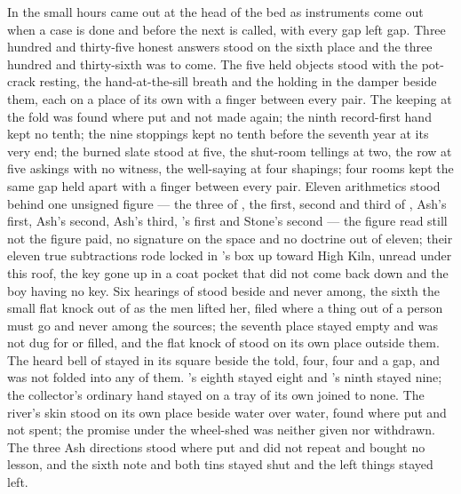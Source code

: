 In the small hours  came out at the head of the bed as instruments come out when a case is done and before the next is called, with every gap left gap. Three hundred and thirty-five honest answers stood on the sixth place and the three hundred and thirty-sixth was to come. The five held objects stood with the pot-crack resting, the hand-at-the-sill breath and the holding in the damper beside them, each on a place of its own with a finger between every pair. The keeping at the fold was found where put and not made again; the ninth record-first hand kept no tenth; the nine stoppings kept no tenth before the seventh year at its very end; the burned slate stood at five, the shut-room tellings at two, the row at five askings with no witness, the well-saying at four shapings; four rooms kept the same gap held apart with a finger between every pair. Eleven arithmetics stood behind one unsigned figure — the three of , the first, second and third of , Ash's first, Ash's second, Ash's third, 's first and Stone's second — the figure read still not the figure paid, no signature on the space and no doctrine out of eleven; their eleven true subtractions rode locked in 's box up  toward High Kiln, unread under this roof, the key gone up in a coat pocket that did not come back down and the boy having no key. Six hearings of  stood beside and never among, the sixth the small flat knock out of  as the men lifted her, filed where a thing out of a person must go and never among the sources; the seventh place stayed empty and was not dug for or filled, and the flat knock of  stood on its own place outside them. The heard bell of  stayed in its square beside the told, four, four and a gap, and was not folded into any of them. 's eighth stayed eight and 's ninth stayed nine; the collector's ordinary hand stayed on a tray of its own joined to none. The river's skin stood on its own place beside water over water, found where put and not spent; the promise under the wheel-shed was neither given nor withdrawn. The three Ash directions stood where put and did not repeat and bought no lesson, and the sixth note and both tins stayed shut and the left things stayed left.

